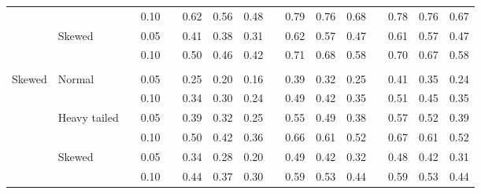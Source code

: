\documentclass{article} %
\begin{document}
\begin{table}[ht]
\begin{scriptsize}
\begin{center}
\begin{tabular}{ll p{.1cm} c p{.1cm} rrr p{.1cm} rrr p{.1cm} rrr}
             &              && 0.10 &&   0.62 & 0.56 & 0.48 && 0.79 & 0.76 & 0.68 &&  0.78 & 0.76 & 0.67 \\
             & Skewed       && 0.05 &&   0.41 & 0.38 & 0.31 && 0.62 & 0.57 & 0.47 &&  0.61 & 0.57 & 0.47 \\
             &              && 0.10 &&   0.50 & 0.46 & 0.42 && 0.71 & 0.68 & 0.58 &&  0.70 & 0.67 & 0.58 \\
             &&&&&&&&&&&&&&&\\
Skewed       & Normal       && 0.05 &&   0.25 & 0.20 & 0.16 && 0.39 & 0.32 & 0.25 && 0.41 & 0.35 & 0.24 \\
             &              && 0.10 &&   0.34 & 0.30 & 0.24 && 0.49 & 0.42 & 0.35 && 0.51 & 0.45 & 0.35 \\
             & Heavy tailed && 0.05 &&   0.39 & 0.32 & 0.25 && 0.55 & 0.49 & 0.38 && 0.57 & 0.52 & 0.39 \\
             &              && 0.10 &&   0.50 & 0.42 & 0.36 && 0.66 & 0.61 & 0.52 && 0.67 & 0.61 & 0.52 \\
             & Skewed       && 0.05 &&   0.34 & 0.28 & 0.20 && 0.49 & 0.42 & 0.32 && 0.48 & 0.42 & 0.31 \\
             &              && 0.10 &&   0.44 & 0.37 & 0.30 && 0.59 & 0.53 & 0.44 && 0.59 & 0.53 & 0.44 \\



\end{tabular}
\end{center}
\end{scriptsize}
\end{table}
\end{document}

